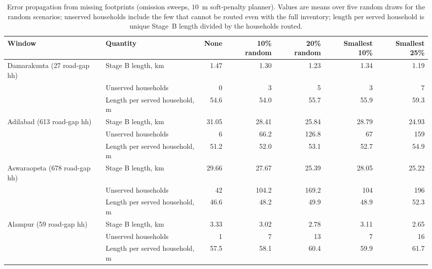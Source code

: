 \documentclass[10pt,a4paper,twocolumn]{article}
\begin{document}
\begin{table}[tbp]
\caption{Error propagation from missing footprints (omission sweeps, $10$~m soft-penalty planner). Values are means over five random draws for the random scenarios; unserved households include the few that cannot be routed even with the full inventory; length per served household is unique Stage~B length divided by the households routed.}
\label{tab:omit}
\centering
\scriptsize
\begin{tabular}{@{}llrrrrr@{}}
\toprule
Window & Quantity & None & 10\% random & 20\% random & Smallest 10\% & Smallest 25\%\\
\midrule
Damarakunta (27 road-gap hh) & Stage B length, km & 1.47 & 1.30 & 1.23 & 1.34 & 1.19\\
 & Unserved households & 0 & 3 & 5 & 3 & 7\\
 & Length per served household, m & 54.6 & 54.0 & 55.7 & 55.9 & 59.3\\
\addlinespace
Adilabad (613 road-gap hh) & Stage B length, km & 31.05 & 28.41 & 25.84 & 28.79 & 24.93\\
 & Unserved households & 6 & 66.2 & 126.8 & 67 & 159\\
 & Length per served household, m & 51.2 & 52.0 & 53.1 & 52.7 & 54.9\\
\addlinespace
Aswaraopeta (678 road-gap hh) & Stage B length, km & 29.66 & 27.67 & 25.39 & 28.05 & 25.22\\
 & Unserved households & 42 & 104.2 & 169.2 & 104 & 196\\
 & Length per served household, m & 46.6 & 48.2 & 49.9 & 48.9 & 52.3\\
\addlinespace
Alampur (59 road-gap hh) & Stage B length, km & 3.33 & 3.02 & 2.78 & 3.11 & 2.65\\
 & Unserved households & 1 & 7 & 13 & 7 & 16\\
 & Length per served household, m & 57.5 & 58.1 & 60.4 & 59.9 & 61.7\\
\bottomrule
\end{tabular}
\end{table}

\FloatBarrier
\end{document}
